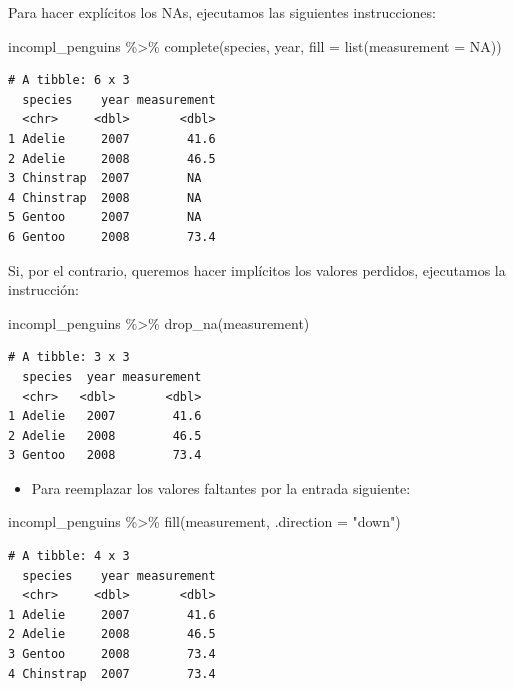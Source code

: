 \documentclass[
  letterpaper,
  DIV=11,
  numbers=noendperiod]{scrreprt}
\newenvironment{Shaded}{\begin{snugshade}}{\end{snugshade}}
\newcommand{\AttributeTok}[1]{\textcolor[rgb]{0.40,0.45,0.13}{#1}}
\newcommand{\ConstantTok}[1]{\textcolor[rgb]{0.56,0.35,0.01}{#1}}
\newcommand{\FunctionTok}[1]{\textcolor[rgb]{0.28,0.35,0.67}{#1}}
\newcommand{\NormalTok}[1]{\textcolor[rgb]{0.00,0.23,0.31}{#1}}
\newcommand{\SpecialCharTok}[1]{\textcolor[rgb]{0.37,0.37,0.37}{#1}}
\newcommand{\StringTok}[1]{\textcolor[rgb]{0.13,0.47,0.30}{#1}}
\providecommand{\tightlist}{%
  \setlength{\itemsep}{0pt}\setlength{\parskip}{0pt}}\usepackage{longtable,booktabs,array}
\begin{document}
Para hacer explícitos los NAs, ejecutamos las siguientes instrucciones:

\begin{Shaded}
\begin{Highlighting}[]
\NormalTok{incompl\_penguins }\SpecialCharTok{\%\textgreater{}\%} 
  \FunctionTok{complete}\NormalTok{(species, year, }\AttributeTok{fill =} \FunctionTok{list}\NormalTok{(}\AttributeTok{measurement =} \ConstantTok{NA}\NormalTok{))}
\end{Highlighting}
\end{Shaded}

\begin{verbatim}
# A tibble: 6 x 3
  species    year measurement
  <chr>     <dbl>       <dbl>
1 Adelie     2007        41.6
2 Adelie     2008        46.5
3 Chinstrap  2007        NA  
4 Chinstrap  2008        NA  
5 Gentoo     2007        NA  
6 Gentoo     2008        73.4
\end{verbatim}

Si, por el contrario, queremos hacer implícitos los valores perdidos,
ejecutamos la instrucción:

\begin{Shaded}
\begin{Highlighting}[]
\NormalTok{incompl\_penguins }\SpecialCharTok{\%\textgreater{}\%} 
  \FunctionTok{drop\_na}\NormalTok{(measurement)}
\end{Highlighting}
\end{Shaded}

\begin{verbatim}
# A tibble: 3 x 3
  species  year measurement
  <chr>   <dbl>       <dbl>
1 Adelie   2007        41.6
2 Adelie   2008        46.5
3 Gentoo   2008        73.4
\end{verbatim}

\begin{itemize}
\tightlist
\item
  Para reemplazar los valores faltantes por la entrada siguiente:
\end{itemize}

\begin{Shaded}
\begin{Highlighting}[]
\NormalTok{incompl\_penguins }\SpecialCharTok{\%\textgreater{}\%} 
  \FunctionTok{fill}\NormalTok{(measurement, }\AttributeTok{.direction =} \StringTok{"down"}\NormalTok{)}
\end{Highlighting}
\end{Shaded}

\begin{verbatim}
# A tibble: 4 x 3
  species    year measurement
  <chr>     <dbl>       <dbl>
1 Adelie     2007        41.6
2 Adelie     2008        46.5
3 Gentoo     2008        73.4
4 Chinstrap  2007        73.4
\end{verbatim}
\end{document}
